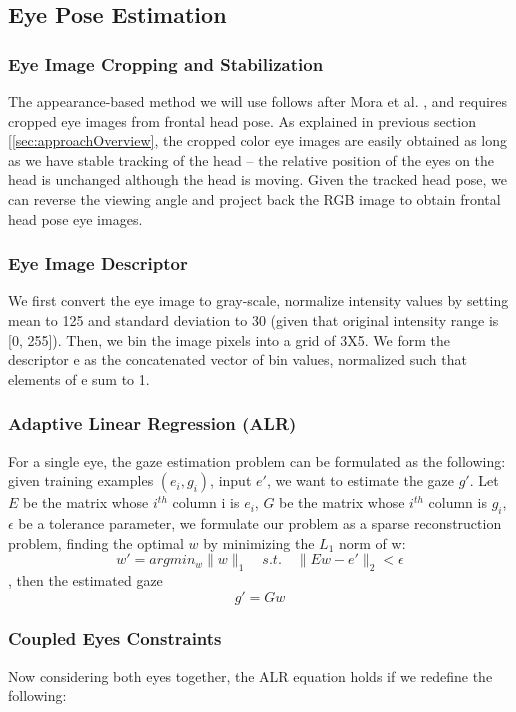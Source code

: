 \subsection{Eye Pose Estimation}

\subsubsection{Eye Image Cropping and Stabilization}
The appearance-based method we will use follows after Mora et al. \cite{funes2013person}, and requires cropped eye images from frontal head pose.  As explained in previous section [\ref{sec:approachOverview}, the cropped color eye images are easily obtained as long as we have stable tracking of the head -- the relative position of the eyes on the head is unchanged although the head is moving.  Given the tracked head pose, we can reverse the viewing angle and project back the RGB image to obtain frontal head pose eye images.


\subsubsection{Eye Image Descriptor}
We first convert the eye image to gray-scale, normalize intensity values by setting mean to 125 and standard deviation to 30 (given that original intensity range is [0, 255]).  Then, we bin the image pixels into a grid of 3X5.  We form the descriptor e as the concatenated vector of bin values, normalized such that elements of e sum to 1.


\subsubsection{Adaptive Linear Regression (ALR)}
For a single eye, the gaze estimation problem can be formulated as the following: given training examples \( {(e_i,g_i )} \), input \(e'\), we want to estimate the gaze \(g'\).
Let \(E\) be the matrix whose \(i^{th}\) column i is \( e_i \), \(G\) be the matrix whose \(i^{th}\) column is \(g_i\), \(\epsilon\) be a tolerance parameter, we formulate our problem as a sparse reconstruction problem, finding the optimal \(w\) by minimizing the \(L_1\) norm of w:
\[ w' = argmin_w \|w\|_1  \quad  s.t.   \quad   \|Ew - e'\|_2 < \epsilon   \]
, then the estimated gaze \[ g' = Gw \]


\subsubsection{Coupled Eyes Constraints}
Now considering both eyes together, the ALR equation holds if we redefine the following:


